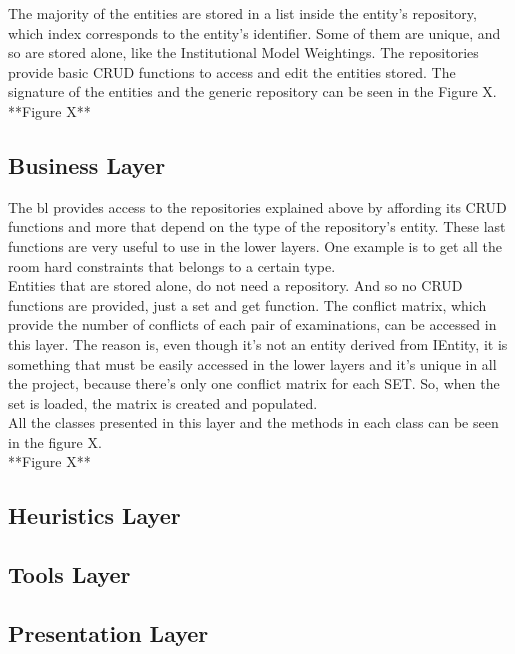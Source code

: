 The majority of the entities are stored in a list inside the entity's repository, which index corresponds to the entity's identifier. Some of them are unique, and so are stored alone, like the Institutional Model Weightings. The repositories provide basic CRUD functions to access and edit the entities stored. The signature of the entities and the generic repository can be seen in the Figure X.\\

**Figure X**

\subsection{Business Layer}

The \gls{bl} provides access to the repositories explained above by affording its CRUD functions and more that depend on the type of the repository's entity. These last functions are very useful to use in the lower layers. One example is to get all the room hard constraints that belongs to a certain type.\\

Entities that are stored alone, do not need a repository. And so no CRUD functions are provided, just a set and get function. The conflict matrix, which provide the number of conflicts of each pair of examinations, can be accessed in this layer. The reason is, even though it's not an entity derived from IEntity, it is something that must be easily accessed in the lower layers and it's unique in all the project, because there's only one conflict matrix for each SET. So, when the set is loaded, the matrix is created and populated.\\

All the classes presented in this layer and the methods in each class can be seen in the figure X.\\

**Figure X**


\subsection{Heuristics Layer}
\subsection{Tools Layer}
\subsection{Presentation Layer}



